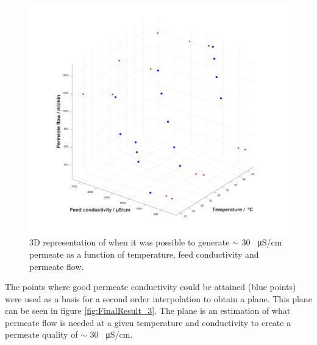 \begin{figure}[H]
    \centering
    \includegraphics[width=1.1\textwidth]{FinalResult_2}
    \caption{3D representation of when it was possible to generate $\sim$ 30 \SI{}{\micro\siemens}/cm permeate as a function of temperature, feed conductivity and permeate flow.}
    \label{fig:FinalResult_2}
\end{figure}

\newpage

The points where good permeate conductivity could be attained (blue points) were used as a basis for a second order interpolation to obtain a plane. This plane can be seen in figure \ref{fig:FinalResult_3}. The plane is an estimation of what permeate flow is needed at a given temperature and conductivity to create a permeate quality of  $\sim$ 30 \SI{}{\micro\siemens}/cm. 

